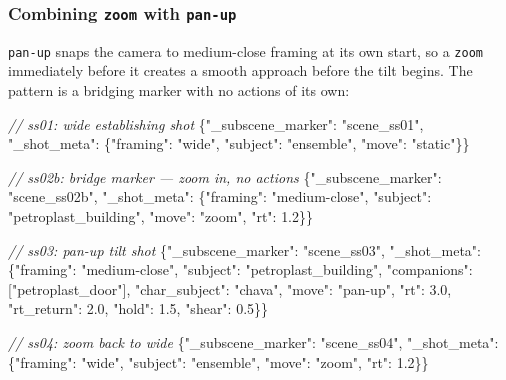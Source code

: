 \documentclass[
  11pt,
]{book}
\newenvironment{Shaded}{}{}
\newcommand{\CommentTok}[1]{\textcolor[rgb]{0.38,0.63,0.69}{\textit{#1}}}
\newcommand{\DataTypeTok}[1]{\textcolor[rgb]{0.56,0.13,0.00}{#1}}
\newcommand{\FloatTok}[1]{\textcolor[rgb]{0.25,0.63,0.44}{#1}}
\newcommand{\FunctionTok}[1]{\textcolor[rgb]{0.02,0.16,0.49}{#1}}
\newcommand{\NormalTok}[1]{#1}
\newcommand{\StringTok}[1]{\textcolor[rgb]{0.25,0.44,0.63}{#1}}
\begin{document}
\subsubsection{Combining \texttt{zoom} with \texttt{pan-up}}\label{zoom-with-pan-up}

\texttt{pan-up} snaps the camera to medium-close framing at its own
start, so a \texttt{zoom} immediately before it creates a smooth
approach before the tilt begins. The pattern is a bridging marker with
no actions of its own:

\begin{Shaded}
\begin{Highlighting}[]
\CommentTok{// ss01: wide establishing shot}
\FunctionTok{\{}\DataTypeTok{"\_subscene\_marker"}\NormalTok{: }\StringTok{"scene\_ss01"}\NormalTok{, }\DataTypeTok{"\_shot\_meta"}\NormalTok{: \{}\DataTypeTok{"framing"}\NormalTok{: }\StringTok{"wide"}\NormalTok{,}
\NormalTok{  }\DataTypeTok{"subject"}\NormalTok{: }\StringTok{"ensemble"}\NormalTok{, }\DataTypeTok{"move"}\NormalTok{: }\StringTok{"static"}\NormalTok{\}\}}

\CommentTok{// ss02b: bridge marker — zoom in, no actions}
\FunctionTok{\{}\DataTypeTok{"\_subscene\_marker"}\NormalTok{: }\StringTok{"scene\_ss02b"}\NormalTok{, }\DataTypeTok{"\_shot\_meta"}\NormalTok{: \{}\DataTypeTok{"framing"}\NormalTok{: }\StringTok{"medium-close"}\NormalTok{,}
\NormalTok{  }\DataTypeTok{"subject"}\NormalTok{: }\StringTok{"petroplast\_building"}\NormalTok{, }\DataTypeTok{"move"}\NormalTok{: }\StringTok{"zoom"}\NormalTok{, }\DataTypeTok{"rt"}\NormalTok{: }\FloatTok{1.2}\NormalTok{\}\}}

\CommentTok{// ss03: pan-up tilt shot}
\FunctionTok{\{}\DataTypeTok{"\_subscene\_marker"}\NormalTok{: }\StringTok{"scene\_ss03"}\NormalTok{, }\DataTypeTok{"\_shot\_meta"}\NormalTok{: \{}\DataTypeTok{"framing"}\NormalTok{: }\StringTok{"medium-close"}\NormalTok{,}
\NormalTok{  }\DataTypeTok{"subject"}\NormalTok{: }\StringTok{"petroplast\_building"}\NormalTok{, }\DataTypeTok{"companions"}\NormalTok{: [}\StringTok{"petroplast\_door"}\NormalTok{],}
\NormalTok{  }\DataTypeTok{"char\_subject"}\NormalTok{: }\StringTok{"chava"}\NormalTok{, }\DataTypeTok{"move"}\NormalTok{: }\StringTok{"pan-up"}\NormalTok{,}
\NormalTok{  }\DataTypeTok{"rt"}\NormalTok{: }\FloatTok{3.0}\NormalTok{, }\DataTypeTok{"rt\_return"}\NormalTok{: }\FloatTok{2.0}\NormalTok{, }\DataTypeTok{"hold"}\NormalTok{: }\FloatTok{1.5}\NormalTok{, }\DataTypeTok{"shear"}\NormalTok{: }\FloatTok{0.5}\NormalTok{\}\}}

\CommentTok{// ss04: zoom back to wide}
\FunctionTok{\{}\DataTypeTok{"\_subscene\_marker"}\NormalTok{: }\StringTok{"scene\_ss04"}\NormalTok{, }\DataTypeTok{"\_shot\_meta"}\NormalTok{: \{}\DataTypeTok{"framing"}\NormalTok{: }\StringTok{"wide"}\NormalTok{,}
\NormalTok{  }\DataTypeTok{"subject"}\NormalTok{: }\StringTok{"ensemble"}\NormalTok{, }\DataTypeTok{"move"}\NormalTok{: }\StringTok{"zoom"}\NormalTok{, }\DataTypeTok{"rt"}\NormalTok{: }\FloatTok{1.2}\NormalTok{\}\}}
\end{Highlighting}
\end{Shaded}
\end{document}
